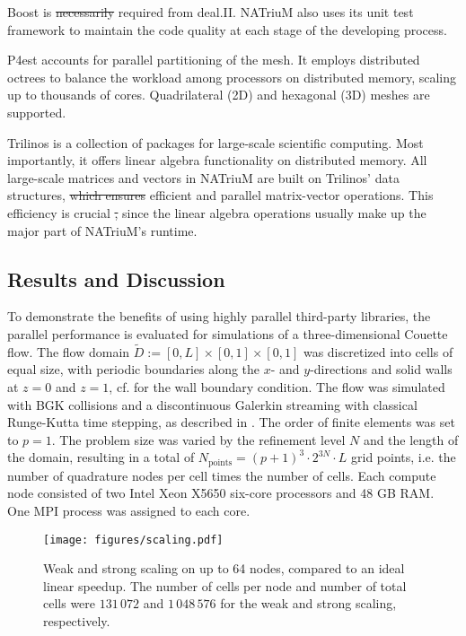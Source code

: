 \documentclass[1p, sort&compress]{elsarticle}
\providecommand{\DIFaddtex}[1]{{\protect\color{blue}\uwave{#1}}} %
\providecommand{\DIFdeltex}[1]{{\protect\color{red}\sout{#1}}}                      %
\providecommand{\DIFaddbegin}{} %
\providecommand{\DIFaddend}{} %
\providecommand{\DIFdelbegin}{} %
\providecommand{\DIFdelend}{} %
\providecommand{\DIFadd}[1]{\texorpdfstring{\DIFaddtex{#1}}{#1}} %
\providecommand{\DIFdel}[1]{\texorpdfstring{\DIFdeltex{#1}}{}} %
\newcommand{\DIFscaledelfig}{0.5}
\newlength{\DIFdelgraphicswidth} %
\newlength{\DIFdelgraphicsheight} %
\newcommand{\DIFaddincludegraphics}[2][]{{\color{blue}\fbox{\DIFOincludegraphics[#1]{#2}}}} %
\newcommand{\DIFdelincludegraphics}[2][]{%
\sbox{\DIFdelgraphicsbox}{\DIFOincludegraphics[#1]{#2}}%
\settoboxwidth{\DIFdelgraphicswidth}{\DIFdelgraphicsbox} %
\settoboxtotalheight{\DIFdelgraphicsheight}{\DIFdelgraphicsbox} %
\scalebox{\DIFscaledelfig}{%
\parbox[b]{\DIFdelgraphicswidth}{\usebox{\DIFdelgraphicsbox}\\[-\baselineskip] \rule{\DIFdelgraphicswidth}{0em}}\llap{\resizebox{\DIFdelgraphicswidth}{\DIFdelgraphicsheight}{%
\setlength{\unitlength}{\DIFdelgraphicswidth}%
\begin{picture}(1,1)%
\thicklines\linethickness{2pt} %
{\color[rgb]{1,0,0}\put(0,0){\framebox(1,1){}}}%
{\color[rgb]{1,0,0}\put(0,0){\line( 1,1){1}}}%
{\color[rgb]{1,0,0}\put(0,1){\line(1,-1){1}}}%
\end{picture}%
}\hspace*{3pt}}} %
} %
\DeclareRobustCommand{\DIFaddbegin}{\DIFOaddbegin \let\includegraphics\DIFaddincludegraphics} %
\DeclareRobustCommand{\DIFaddend}{\DIFOaddend \let\includegraphics\DIFOincludegraphics} %
\DeclareRobustCommand{\DIFdelbegin}{\DIFOdelbegin \let\includegraphics\DIFdelincludegraphics} %
\DeclareRobustCommand{\DIFdelend}{\DIFOaddend \let\includegraphics\DIFOincludegraphics} %
\begin{document}
Boost is \DIFdelbegin \DIFdel{necessarily }\DIFdelend required from deal.II. NATriuM also uses its unit test framework to maintain the code quality at each stage of the developing process. 

P4est accounts for parallel partitioning of the mesh. It employs distributed octrees to balance the workload among processors on distributed memory, scaling up to thousands of cores. Quadrilateral (2D) and hexagonal (3D) meshes are supported. 

Trilinos is a collection of packages for large-scale scientific computing. Most importantly, it offers linear algebra functionality on distributed memory. All large-scale matrices and vectors in NATriuM are built on Trilinos’ data structures, \DIFdelbegin \DIFdel{which ensures }\DIFdelend \DIFaddbegin \DIFadd{ensuring }\DIFaddend efficient and parallel matrix-vector operations. This efficiency is crucial \DIFdelbegin \DIFdel{, }\DIFdelend since the linear algebra operations usually make up the major part of NATriuM’s runtime.


\subsection{Results and Discussion}
To demonstrate the benefits of using highly parallel third-party libraries, the parallel performance is evaluated for simulations of a three-dimensional Couette flow. The flow domain $\tilde{D}:=[0,L]\times[0,1]\times[0,1]$ was discretized into cells of equal size, with periodic boundaries along the $x$- and $y$-directions and solid walls at $z=0$ and $z=1$, cf. \cite{Min.2011} for the wall boundary condition. The flow was simulated with BGK collisions and a discontinuous Galerkin streaming with classical Runge-Kutta time stepping, as described in \cite{Min.2011}. The order of finite elements was set to $p=1$. The problem size was varied by the refinement level $N$ and the length of the domain, resulting in a total of $N_{\mathrm{points}} = (p+1)^3 \cdot 2^{3N} \cdot L$ grid points, i.e. the number of quadrature nodes per cell times the number of cells.  Each compute node consisted of two Intel Xeon X5650 six-core processors and 48 GB RAM. One MPI process was assigned to each core. 

\begin{figure}[htbp]
 	\centering
	\texttt{[image: figures/scaling.pdf]}
 	\caption{\label{fig:speedup} Weak and strong scaling on up to 64 nodes, compared to an ideal linear speedup. The number of cells per node and number of total cells were $131\,072$ and $1\,048\,576$ for the weak and strong scaling, respectively.}
\end{figure}
\end{document}
